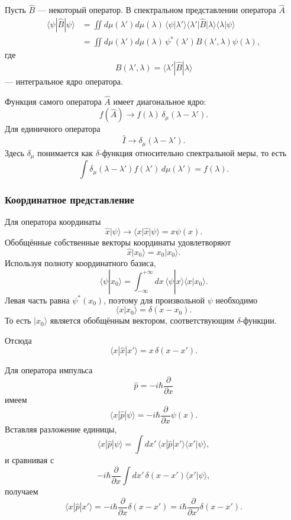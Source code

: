 \documentclass[12pt,a4paper]{article}
\begin{document}
Пусть $\hat B$ --- некоторый оператор. В спектральном представлении
оператора $\hat A$
\begin{align*}
    \langle\psi|\hat B|\psi\rangle
    &=
    \iint
        d\mu(\lambda')
        d\mu(\lambda)\,
        \langle\psi|\lambda'\rangle
        \langle\lambda'|\hat B|\lambda\rangle
        \langle\lambda|\psi\rangle
    \\
    &=
    \iint
        d\mu(\lambda')
        d\mu(\lambda)\,
        \psi^*(\lambda')
        B(\lambda',\lambda)
        \psi(\lambda),
\end{align*}
где
\[
    \boxed{
        B(\lambda',\lambda)
        =
        \langle\lambda'|\hat B|\lambda\rangle
    }
\]
--- интегральное ядро оператора.

Функция самого оператора $\hat A$ имеет диагональное ядро:
\[
    \boxed{
        f(\hat A)
        \longrightarrow
        f(\lambda)\,
        \delta_\mu(\lambda-\lambda')
    }.
\]
Для единичного оператора
\[
    \boxed{
        \hat I
        \longrightarrow
        \delta_\mu(\lambda-\lambda')
    }.
\]
Здесь $\delta_\mu$ понимается как $\delta$-функция относительно
спектральной меры, то есть
\[
    \int
        \delta_\mu(\lambda-\lambda')
        f(\lambda')\,d\mu(\lambda')
    =
    f(\lambda).
\]


\subsubsection{Координатное представление}

Для оператора координаты
\[
    \hat x|\psi\rangle
    \longrightarrow
    \langle x|\hat x|\psi\rangle
    =
    x\psi(x).
\]
Обобщённые собственные векторы координаты удовлетворяют
\[
    \boxed{
        \hat x|x_0\rangle
        =
        x_0|x_0\rangle
    }.
\]
Используя полноту координатного базиса,
\[
    \langle\psi|x_0\rangle
    =
    \int_{-\infty}^{+\infty}
        dx\,
        \langle\psi|x\rangle
        \langle x|x_0\rangle.
\]
Левая часть равна $\psi^*(x_0)$, поэтому для произвольной $\psi$
необходимо
\[
    \boxed{
        \langle x|x_0\rangle
        =
        \delta(x-x_0)
    }.
\]
То есть $|x_0\rangle$ является обобщённым вектором, соответствующим
$\delta$-функции.

Отсюда
\[
    \boxed{
        \langle x|\hat x|x'\rangle
        =
        x\,\delta(x-x')
    }.
\]

Для оператора импульса
\[
    \hat p
    =
    -i\hbar\frac{\partial}{\partial x}
\]
имеем
\[
    \langle x|\hat p|\psi\rangle
    =
    -i\hbar
    \frac{\partial}{\partial x}
    \psi(x).
\]
Вставляя разложение единицы,
\[
    \langle x|\hat p|\psi\rangle
    =
    \int dx'\,
        \langle x|\hat p|x'\rangle
        \langle x'|\psi\rangle,
\]
и сравнивая с
\[
    -i\hbar
    \frac{\partial}{\partial x}
    \int dx'\,
        \delta(x-x')
        \langle x'|\psi\rangle,
\]
получаем
\[
    \boxed{
        \langle x|\hat p|x'\rangle
        =
        -i\hbar
        \frac{\partial}{\partial x}
        \delta(x-x')
        =
        i\hbar
        \frac{\partial}{\partial x'}
        \delta(x-x')
    }.
\]
\end{document}
